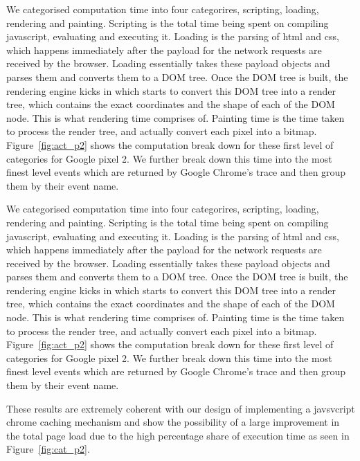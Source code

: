 We categorised computation time into four categorires, scripting, loading, rendering and
painting. Scripting is the total time being spent on
compiling javascript, evaluating and executing it. Loading is the parsing of html and css, which happens 
immediately after the payload for the network requests are received by the browser. Loading essentially
takes these payload objects and parses them and converts them to a DOM tree. Once the DOM tree is built,
the rendering engine kicks in which starts to convert this DOM tree into a render tree, which contains the
exact coordinates and the shape of each of the DOM node. This is what rendering time comprises of. 
Painting time is the time taken to process the render tree, and actually convert
each pixel into a bitmap.
Figure~\ref{fig:act_p2} shows the computation break down for these first level of categories
for Google pixel 2. We further break down this time into the most finest level events
which are returned by Google Chrome's trace and then group them by their event name.

We categorised computation time into four categorires, scripting,
loading, rendering and painting. Scripting is the total time being
spent on compiling javascript, evaluating and executing it. Loading is
the parsing of html and css, which happens immediately after the
payload for the network requests are received by the browser. Loading
essentially takes these payload objects and parses them and converts
them to a DOM tree. Once the DOM tree is built, the rendering engine
kicks in which starts to convert this DOM tree into a render tree,
which contains the exact coordinates and the shape of each of the DOM
node. This is what rendering time comprises of.  Painting time is the
time taken to process the render tree, and actually convert each pixel
into a bitmap.  Figure~\ref{fig:act_p2} shows the computation break
down for these first level of categories for Google pixel 2. We
further break down this time into the most finest level events which
are returned by Google Chrome's trace and then group them by their
event name.

These results are extremely coherent with our design of implementing a
javsvcript chrome caching mechanism and show the possibility of a
large improvement in the total page load due to the high percentage
share of execution time as seen in Figure~\ref{fig:cat_p2}.

